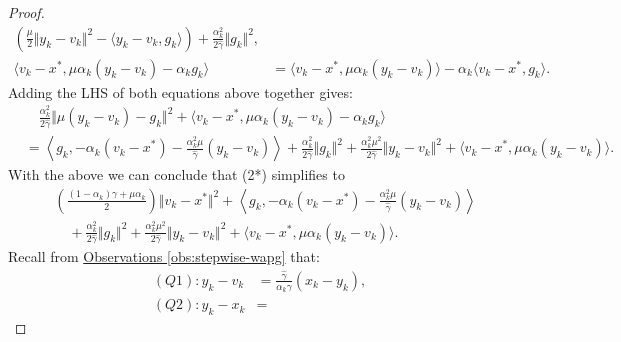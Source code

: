 \documentclass[12pt]{article}
\begin{document}
\begin{proof}
\begin{align*}
            \left(
                \frac{\mu}{2}\Vert y_k - v_k\Vert^2 
                - \langle y_k - v_k, g_k\rangle
            \right)
            + \frac{\alpha_k^2}{2\hat \gamma}\Vert g_k\Vert^2, 
            \\
            \langle v_k - x^*, \mu \alpha_k(y_k - v_k) - \alpha_k g_k\rangle
            &= 
            \langle v_k - x^*, \mu\alpha_k(y_k - v_k)\rangle 
            - \alpha_k \langle v_k - x^*, g_k\rangle. 
        \tag{2.1*}
        \end{align*}
        Adding the LHS of both equations above together gives: 
        {\small
        \begin{align*}
            & \quad 
            \frac{\alpha^2_k}{2\hat \gamma} 
            \Vert \mu(y_k - v_k) - g_k\Vert^2
            + 
            \langle v_k - x^*, \mu \alpha_k(y_k - v_k) - \alpha_k g_k\rangle
            \\
            &= 
            \left\langle g_k, 
                - \alpha_k(v_k - x^*) 
                - \frac{\alpha_k^2\mu}{\hat \gamma}(y_k - v_k)
            \right\rangle
            + \frac{\alpha_k^2}{2\hat \gamma}\Vert g_k\Vert^2
            + \frac{\alpha_k^2 \mu^2}{2\hat \gamma}\Vert y_k - v_k\Vert^2
            + \langle v_k - x^*, \mu\alpha_k(y_k - v_k)\rangle. 
        \end{align*}
        }
        With the above we can conclude that (2*) simplifies to 
        {\small
        \begin{align*} 
            & 
            \left(
            \frac{(1 - \alpha_k)\gamma + \mu \alpha_k}{2} 
            \right)\Vert v_k - x^*\Vert^2
            + 
            \left\langle g_k, 
                - \alpha_k(v_k - x^*) 
                - \frac{\alpha_k^2\mu}{\hat \gamma}(y_k - v_k)
            \right\rangle
            \\
            & \quad 
                + \frac{\alpha_k^2}{2\hat \gamma}\Vert g_k\Vert^2
                + \frac{\alpha_k^2 \mu^2}{2\hat \gamma}\Vert y_k - v_k\Vert^2
                + \langle v_k - x^*, \mu\alpha_k(y_k - v_k)\rangle. 
        \tag{2.2*}
        \end{align*}
        }
        Recall from 
        \hyperref[obs:stepwise-wapg]{Observations \ref*{obs:stepwise-wapg}} that: 
        \begin{align*}
            (Q1): 
            y_k - v_k &= 
            \frac{\hat \gamma}{\alpha_k \gamma}(x_k - y_k),
            \\
            (Q2): 
            y_k - x_k &= 

\end{align*}
\end{proof}
\end{document}
